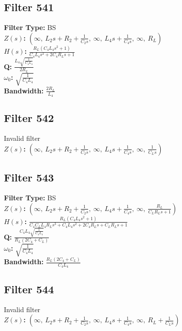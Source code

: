 \documentclass{article}
\begin{document}
\subsection*{Filter 541}
\textbf{Filter Type:} BS \\ 
\textbf{$Z(s)$:} $\left( \infty, \  L_{2} s + R_{2} + \frac{1}{C_{2} s}, \  \infty, \  L_{4} s + \frac{1}{C_{4} s}, \  \infty, \  R_{L}\right)$ \\ 
\textbf{$H(s)$:} $\frac{R_{L} \left(C_{4} L_{4} s^{2} + 1\right)}{C_{4} L_{4} s^{2} + 2 C_{4} R_{L} s + 1}$ \\ 
\textbf{Q:} $\frac{L_{4} \sqrt{\frac{1}{C_{4} L_{4}}}}{2 R_{L}}$ \\ 
\textbf{$\omega_0$:} $\sqrt{\frac{1}{C_{4} L_{4}}}$ \\ 
\textbf{Bandwidth:} $\frac{2 R_{L}}{L_{4}}$ \\ 
\subsection*{Filter 542}
Invalid filter \\ 
\textbf{$Z(s)$:} $\left( \infty, \  L_{2} s + R_{2} + \frac{1}{C_{2} s}, \  \infty, \  L_{4} s + \frac{1}{C_{4} s}, \  \infty, \  \frac{1}{C_{L} s}\right)$ \\ 
\subsection*{Filter 543}
\textbf{Filter Type:} BS \\ 
\textbf{$Z(s)$:} $\left( \infty, \  L_{2} s + R_{2} + \frac{1}{C_{2} s}, \  \infty, \  L_{4} s + \frac{1}{C_{4} s}, \  \infty, \  \frac{R_{L}}{C_{L} R_{L} s + 1}\right)$ \\ 
\textbf{$H(s)$:} $\frac{R_{L} \left(C_{4} L_{4} s^{2} + 1\right)}{C_{4} C_{L} L_{4} R_{L} s^{3} + C_{4} L_{4} s^{2} + 2 C_{4} R_{L} s + C_{L} R_{L} s + 1}$ \\ 
\textbf{Q:} $\frac{C_{4} L_{4} \sqrt{\frac{1}{C_{4} L_{4}}}}{R_{L} \left(2 C_{4} + C_{L}\right)}$ \\ 
\textbf{$\omega_0$:} $\sqrt{\frac{1}{C_{4} L_{4}}}$ \\ 
\textbf{Bandwidth:} $\frac{R_{L} \left(2 C_{4} + C_{L}\right)}{C_{4} L_{4}}$ \\ 
\subsection*{Filter 544}
Invalid filter \\ 
\textbf{$Z(s)$:} $\left( \infty, \  L_{2} s + R_{2} + \frac{1}{C_{2} s}, \  \infty, \  L_{4} s + \frac{1}{C_{4} s}, \  \infty, \  R_{L} + \frac{1}{C_{L} s}\right)$ \\ 
\end{document}
